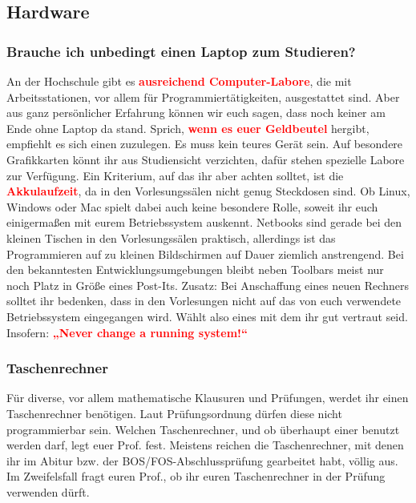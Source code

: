 \subsection{Hardware}

\subsubsection{Brauche ich unbedingt einen Laptop zum Studieren?}

An der Hochschule gibt es \textcolor{red}{\textbf{ausreichend Computer-Labore}}, die mit Arbeitsstationen, vor allem für Programmiertätigkeiten, ausgestattet sind. Aber aus ganz persönlicher Erfahrung können wir euch sagen, dass noch keiner am Ende ohne Laptop da stand. Sprich, \textcolor{red}{\textbf{wenn es euer Geldbeutel}} hergibt, empfiehlt es sich einen zuzulegen. Es muss kein teures Gerät sein. Auf besondere Grafikkarten könnt ihr aus Studiensicht verzichten, dafür stehen spezielle Labore zur Verfügung. Ein Kriterium, auf das ihr aber achten solltet, ist die \textcolor{red}{\textbf{Akkulaufzeit}}, da in den Vorlesungssälen nicht genug Steckdosen sind. Ob Linux, Windows oder Mac spielt dabei auch keine besondere Rolle, soweit ihr euch einigermaßen mit eurem Betriebssystem auskennt. Netbooks sind gerade bei den kleinen Tischen in den Vorlesungssälen praktisch, allerdings ist das Programmieren auf zu kleinen Bildschirmen
auf Dauer ziemlich anstrengend. Bei den bekanntesten Entwicklungsumgebungen bleibt neben Toolbars meist nur noch Platz in Größe eines Post-Its.\doublebreak
Zusatz: Bei Anschaffung eines neuen Rechners solltet ihr bedenken, dass in den Vorlesungen nicht auf das von euch verwendete Betriebssystem eingegangen wird. Wählt also eines mit dem ihr gut vertraut seid.\doublebreak
Insofern: \textcolor{red}{\textbf{„Never change a running system!“}}

\subsubsection{Taschenrechner}

Für diverse, vor allem mathematische Klausuren und Prüfungen, werdet ihr einen Taschenrechner benötigen. Laut Prüfungsordnung dürfen diese nicht programmierbar sein. Welchen Taschenrechner, und ob überhaupt einer benutzt werden darf, legt euer Prof. fest. Meistens reichen die Taschenrechner, mit denen ihr im Abitur bzw.
der BOS/FOS-Abschlussprüfung gearbeitet habt, völlig aus. Im Zweifelsfall fragt euren Prof., ob ihr euren Taschenrechner in der Prüfung verwenden dürft.